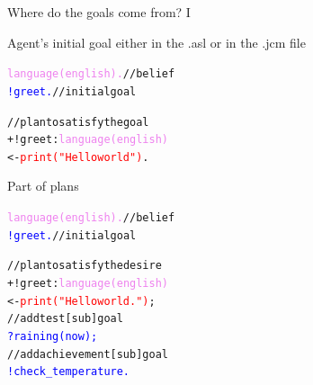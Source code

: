 \documentclass[compress]{beamer}
\newcommand{\planhead}[1]{\textcolor{indiagreen}{#1}}
\newcommand{\desire}[1]{\textcolor{blue}{#1}}
\newcommand{\instruction}[1]{\textcolor{red}{#1}}
\newcommand{\comment}[1]{\textcolor{harvestgold}{#1}}
\newcommand{\belief}[1]{\textcolor{violet}{#1}}
\begin{document}
\begin{frame}[fragile]{Where do the goals come from? I }
 

\begin{block}{Agent's initial goal {\tiny either in the .asl or in the .jcm file}}
 \begin{alltt}\tiny
   \belief{language(english).} \comment{//belief} 
   \desire{!greet.} \comment{//initial goal}

   \comment{//plan to satisfy the goal}  
   \planhead{+!greet} : \belief{language(english)}
       <- \instruction{print("Hello world")}.
    

\end{alltt}

\end{block}


 
\begin{block}{Part of plans}
\begin{alltt}\tiny
   \belief{language(english).} \comment{//belief} 
   \desire{!greet.} \comment{//initial goal}
   
   \comment{//plan to satisfy the desire}  
   \planhead{+!greet} : \belief{language(english)}
       <- \instruction{print("Hello world.")};
          \comment{//add test [sub]goal}
          \desire{?raining(now);} 
          \comment{//add achievement [sub]goal}
          \desire{!check\_temperature.} 
\end{alltt}
\end{block}


\end{frame}
\end{document}
